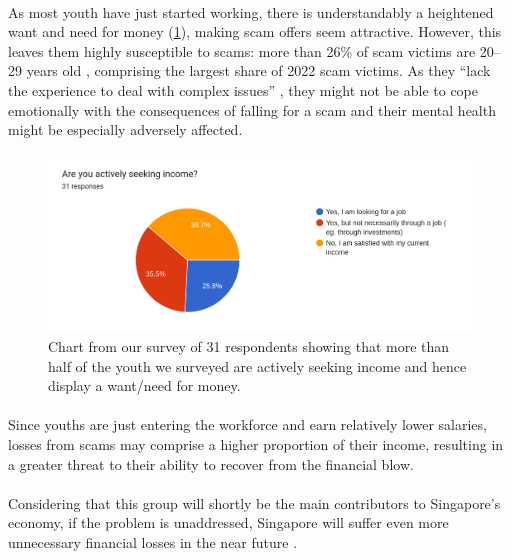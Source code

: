 \documentclass[a4paper]{article}
\begin{document}
\paragraph{} As most youth have just started working, there is understandably a
heightened want and need for money (\cref{fig:incomegraph}), making scam offers
seem attractive. However, this leaves them highly susceptible to scams: more
than 26\% of scam victims are 20--29 years old \parencite{Chua.2023}, comprising
the largest share of 2022 scam victims. As they ``lack the experience to deal
with complex issues'' \parencite{SiowDivi.2023}, they might not be able to cope
emotionally with the consequences of falling for a scam and their mental health
might be especially adversely affected.

\begin{figure}[ht]
  \centering \includegraphics[width=\textwidth]{incomegraph}
  \caption{Chart from our survey of 31 respondents showing that more than half
    of the youth we surveyed are actively seeking income and hence display a
    want/need for money.}\label{fig:incomegraph}
\end{figure}

\paragraph{} Since youths are just entering the workforce and earn relatively
lower salaries, losses from scams may comprise a higher proportion of their
income, resulting in a greater threat to their ability to recover from the
financial blow.

\paragraph{} Considering that this group will shortly be the main contributors
to Singapore’s economy, if the problem is unaddressed, Singapore will suffer
even more unnecessary financial losses in the near future
\parencite{SiowDivi.2023}.
\end{document}
